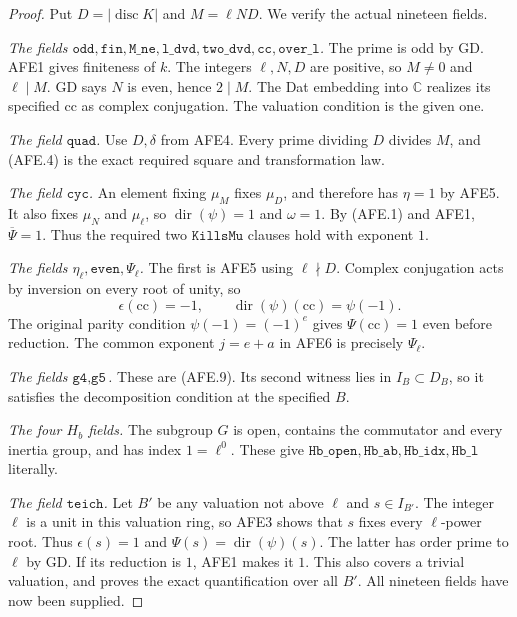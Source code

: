 \begin{proof}
Put \(D=|\operatorname{disc}K|\) and \(M=\ell ND\).
We verify the actual nineteen fields.

\emph{The fields \(\texttt{odd},\texttt{fin},
\texttt{M\_ne},\texttt{l\_dvd},\texttt{two\_dvd},
\texttt{cc},\texttt{over\_l}\).}
The prime is odd by GD.  AFE1 gives finiteness of \(k\).
The integers \(\ell,N,D\) are positive, so \(M\ne0\)
and \(\ell\mid M\).  GD says \(N\) is even, hence
\(2\mid M\).  The Dat embedding into \(\mathbb C\)
realizes its specified \(\mathrm{cc}\) as complex
conjugation.  The valuation condition is the given one.

\emph{The field \(\texttt{quad}\).}
Use \(D,\delta\) from AFE4.  Every prime dividing
\(D\) divides \(M\), and (AFE.4) is the exact
required square and transformation law.

\emph{The field \(\texttt{cyc}\).}
An element fixing \(\mu_M\) fixes \(\mu_D\), and
therefore has \(\eta=1\) by AFE5.
It also fixes \(\mu_N\) and \(\mu_\ell\), so
\(\operatorname{dir}(\psi)=1\) and \(\omega=1\).
By (AFE.1) and AFE1, \(\overline\Psi=1\).
Thus the required two \(\texttt{KillsMu}\) clauses
hold with exponent \(1\).

\emph{The fields \(\eta_\ell,\texttt{even},\Psi_\ell\).}
The first is AFE5 using \(\ell\nmid D\).
Complex conjugation acts by inversion on every root
of unity, so
\[
       \epsilon(\mathrm{cc})=-1,\qquad
       \operatorname{dir}(\psi)(\mathrm{cc})=\psi(-1).
 \]
The original parity condition
\(\psi(-1)=(-1)^e\) gives \(\Psi(\mathrm{cc})=1\)
even before reduction.  The common exponent
\(j=e+a\) in AFE6 is precisely \(\Psi_\ell\).

\emph{The fields \(\texttt{g4},\texttt{g5}\).}
These are (AFE.9).  Its second witness lies in
\(I_B\subset D_B\), so it satisfies the decomposition
condition at the specified \(B\).

\emph{The four \(H_b\) fields.}
The subgroup \(G\) is open, contains the commutator
and every inertia group, and has index
\(1=\ell^0\).  These give
\(\texttt{Hb\_open},\texttt{Hb\_ab},\texttt{Hb\_idx},
\texttt{Hb\_l}\) literally.

\emph{The field \(\texttt{teich}\).}
Let \(B'\) be any valuation not above \(\ell\)
and \(s\in I_{B'}\).  The integer \(\ell\) is
a unit in this valuation ring, so AFE3 shows
that \(s\) fixes every \(\ell\)-power root.
Thus \(\epsilon(s)=1\) and
\(\Psi(s)=\operatorname{dir}(\psi)(s)\).
The latter has order prime to \(\ell\) by GD.
If its reduction is \(1\), AFE1 makes it \(1\).
This also covers a trivial valuation, and proves
the exact quantification over all \(B'\).
All nineteen fields have now been supplied.
\end{proof}

